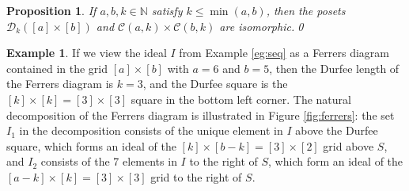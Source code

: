 \documentclass[11pt]{amsart}
\theoremstyle{plain}
\newtheorem{proposition}[theorem]{Proposition}
\theoremstyle{definition}
\newtheorem{example}[theorem]{Example}
\theoremstyle{remark}
\numberwithin{equation}{section}
\newcommand{\N}{\mathbb{N}}
\newcommand{\calc}{\mathcal{C}}
\newcommand{\dkab}{\mathcal{D}_k([a]\times[b])}
\begin{document}
\begin{proposition}
\label{prop:Durfee}
If $a,b,k\in \N$ satisfy $k\le \min(a,b)$, then the posets $\dkab$ and $
\calc(a,k)\times \calc(b,k)$ are isomorphic.\qed
\end{proposition}




\begin{example}
    \label{eg:ferrers}
If we view the ideal $I$ from Example \ref{eg:seq} as a Ferrers diagram
contained in the grid $[a]\times[b]$ with $a=6$ and $b=5$, then the Durfee length
of the Ferrers diagram is $k=3$, and the Durfee square is the
$[k]\times[k]=[3]\times[3]$ square in the bottom left corner. The natural
decomposition of the Ferrers diagram is illustrated in Figure
\ref{fig:ferrers}: the set $I_1$ in the decomposition consists of the
unique element in $I$ above the Durfee square, which forms an ideal of the
$[k]\times[b-k]=[3]\times[2]$ grid above $S$, and $I_2$ consists of the 7
elements in $I$ to the right of $S$, which form an ideal of the
$[a-k]\times[k]=[3]\times[3]$ grid to the right of $S$. 


\begin{figure}[h!]
            \centering
\end{figure}
\end{example}
\end{document}
